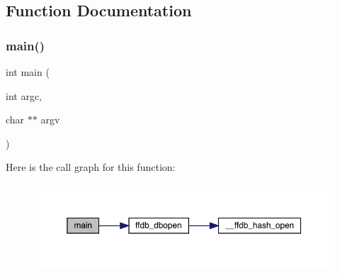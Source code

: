 \subsection{Function Documentation}
\mbox{\label{tread-th_8c_a3c04138a5bfe5d72780bb7e82a18e627}} 
\subsubsection{\texorpdfstring{main()}{main()}}
{\footnotesize\ttfamily int main (\begin{DoxyParamCaption}\item[{int}]{argc,  }\item[{char $\ast$$\ast$}]{argv }\end{DoxyParamCaption})}

Here is the call graph for this function\+:\nopagebreak
\begin{figure}[H]
\begin{center}
\leavevmode
\includegraphics[width=350pt]{d0/d68/tread-th_8c_a3c04138a5bfe5d72780bb7e82a18e627_cgraph}
\end{center}
\end{figure}

